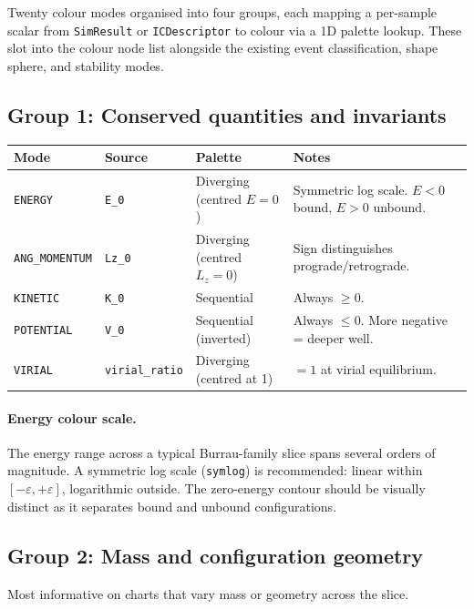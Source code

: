 \documentclass[11pt]{report}
\begin{document}
Twenty colour modes organised into four groups, each mapping a per-sample scalar from \texttt{SimResult} or \texttt{ICDescriptor} to colour via a 1D palette lookup. These slot into the colour node list alongside the existing event classification, shape sphere, and stability modes.

\subsection{Group 1: Conserved quantities and invariants}

\begin{center}
\begin{tabular}{llll}
\toprule
Mode & Source & Palette & Notes \\
\midrule
\texttt{ENERGY} & \texttt{E\_0} & Diverging (centred $E=0$) & Symmetric log scale. $E<0$ bound, $E>0$ unbound. \\
\texttt{ANG\_MOMENTUM} & \texttt{Lz\_0} & Diverging (centred $L_z=0$) & Sign distinguishes prograde/retrograde. \\
\texttt{KINETIC} & \texttt{K\_0} & Sequential & Always $\geq 0$. \\
\texttt{POTENTIAL} & \texttt{V\_0} & Sequential (inverted) & Always $\leq 0$. More negative = deeper well. \\
\texttt{VIRIAL} & \texttt{virial\_ratio} & Diverging (centred at 1) & $=1$ at virial equilibrium. \\
\bottomrule
\end{tabular}
\end{center}

\paragraph{Energy colour scale.} The energy range across a typical Burrau-family slice spans several orders of magnitude. A symmetric log scale (\texttt{symlog}) is recommended: linear within $[-\varepsilon,+\varepsilon]$, logarithmic outside. The zero-energy contour should be visually distinct as it separates bound and unbound configurations.

\subsection{Group 2: Mass and configuration geometry}

Most informative on charts that vary mass or geometry across the slice.
\end{document}
